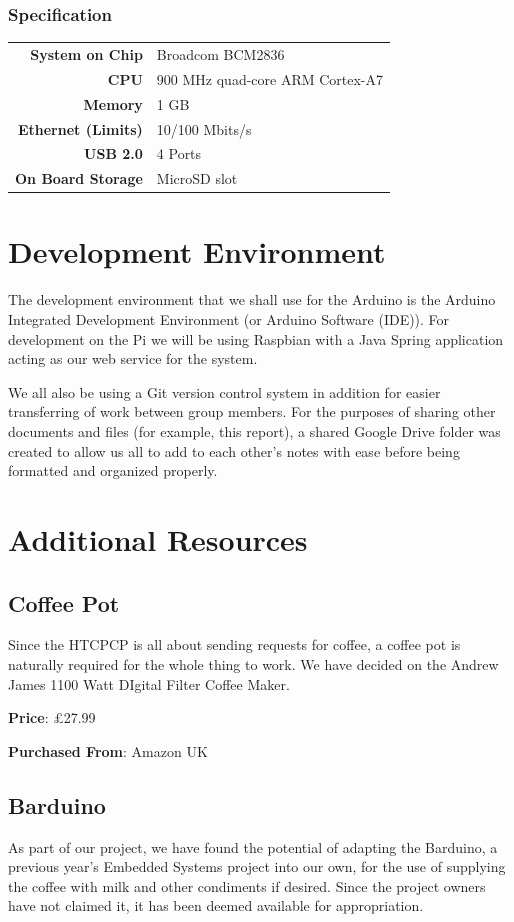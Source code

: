 \documentclass[12pt, a4paper]{article}
\begin{document}
\subsubsection{Specification}
\begin{tabular}{>{\bfseries}r l}
	System on Chip & Broadcom BCM2836 \\
	CPU & 900 MHz quad-core ARM Cortex-A7 \\
	Memory & 1 GB \\
	Ethernet (Limits) & 10/100 Mbits/s \\
	USB 2.0 & 4 Ports \\
	On Board Storage & MicroSD slot \\
\end{tabular}

\newpage

\section{Development Environment}
The development environment that we shall use for the Arduino is the Arduino
Integrated Development Environment (or Arduino Software (IDE)). For development
on the Pi we will be using Raspbian with a Java Spring application acting as our
web service for the system.

We all also be using a Git version control system in addition for easier
transferring of work between group members. For the purposes of sharing other
documents and files (for example, this report), a shared Google Drive folder was
created to allow us all to add to each other's notes with ease before being
formatted and organized properly.

\section{Additional Resources}
\subsection{Coffee Pot}
Since the HTCPCP is all about sending requests for coffee, a coffee pot is
naturally required for the whole thing to work. We have decided on the Andrew
James 1100 Watt DIgital Filter Coffee Maker.

\textbf{Price}: £27.99

\textbf{Purchased From}: Amazon UK
\subsection{Barduino}
As part of our project, we have found the potential of adapting the Barduino, a
previous year’s Embedded Systems project into our own, for the use of supplying
the coffee with milk and other condiments if desired. Since the project owners
have not claimed it, it has been deemed available for appropriation.
\end{document}
